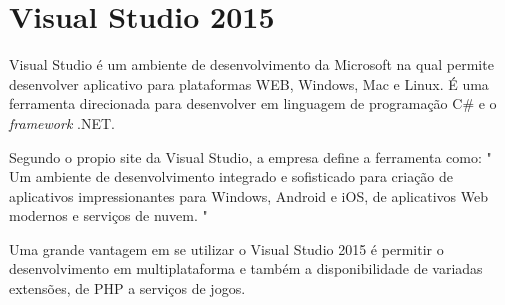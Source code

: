 	\section{Visual Studio 2015}
\label{sec:Visual Studio 2015}

Visual Studio é um ambiente de desenvolvimento da Microsoft na qual permite desenvolver aplicativo para plataformas WEB, Windows, Mac e Linux. É uma ferramenta direcionada para desenvolver em linguagem de programação C\# e o \textit{framework} .NET.

Segundo o propio site da Visual Studio, a empresa define a ferramenta como: " Um ambiente de desenvolvimento integrado e sofisticado para criação de aplicativos impressionantes para Windows, Android e iOS, de aplicativos Web modernos e serviços de nuvem. " 

Uma grande vantagem em se utilizar o Visual Studio 2015 é permitir o desenvolvimento em multiplataforma e também a disponibilidade de variadas extensões, de PHP a serviços de jogos. \cite{vs}
